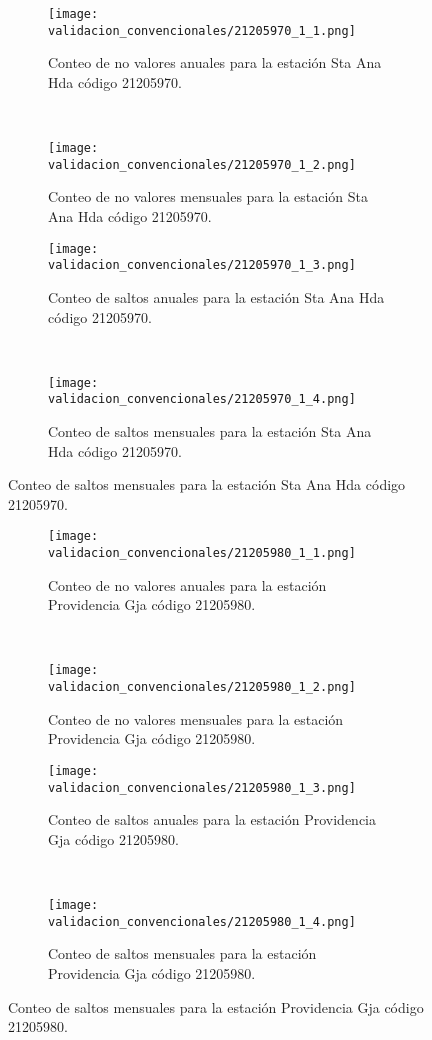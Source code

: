 \begin{figure}[H]\ContinuedFloat
\centering
	\begin{subfigure}[normla]{0.4\textwidth}
	\texttt{[image: validacion\_convencionales/21205970\_1\_1.png]}
		\caption{Conteo de no valores anuales para la estación Sta Ana Hda código 21205970.}
		\label{subfig:a1}
		\end{subfigure}
		~
    \begin{subfigure}[normla]{0.4\textwidth}
	\texttt{[image: validacion\_convencionales/21205970\_1\_2.png]}
		\caption{Conteo de no valores mensuales para la estación Sta Ana Hda código 21205970.}
		\label{subfig:a2}
		\end{subfigure}
		
    \begin{subfigure}[normla]{0.4\textwidth}
	\texttt{[image: validacion\_convencionales/21205970\_1\_3.png]}
		\caption{Conteo de saltos anuales para la estación Sta Ana Hda código 21205970.}
		\label{subfig:a1}
		\end{subfigure}
		~
    \begin{subfigure}[normla]{0.4\textwidth}
	\texttt{[image: validacion\_convencionales/21205970\_1\_4.png]}
		\caption{Conteo de saltos mensuales para la estación Sta Ana Hda código 21205970.}
		\label{subfig:a2}
		\end{subfigure}

	
\end{figure}
           
\begin{figure}[H]\ContinuedFloat
\centering
	\begin{subfigure}[normla]{0.4\textwidth}
	\texttt{[image: validacion\_convencionales/21205980\_1\_1.png]}
		\caption{Conteo de no valores anuales para la estación Providencia Gja código 21205980.}
		\label{subfig:a1}
		\end{subfigure}
		~
    \begin{subfigure}[normla]{0.4\textwidth}
	\texttt{[image: validacion\_convencionales/21205980\_1\_2.png]}
		\caption{Conteo de no valores mensuales para la estación Providencia Gja código 21205980.}
		\label{subfig:a2}
		\end{subfigure}
		
    \begin{subfigure}[normla]{0.4\textwidth}
	\texttt{[image: validacion\_convencionales/21205980\_1\_3.png]}
		\caption{Conteo de saltos anuales para la estación Providencia Gja código 21205980.}
		\label{subfig:a1}
		\end{subfigure}
		~
    \begin{subfigure}[normla]{0.4\textwidth}
	\texttt{[image: validacion\_convencionales/21205980\_1\_4.png]}
		\caption{Conteo de saltos mensuales para la estación Providencia Gja código 21205980.}
		\label{subfig:a2}
		\end{subfigure}

	
\end{figure}
           

